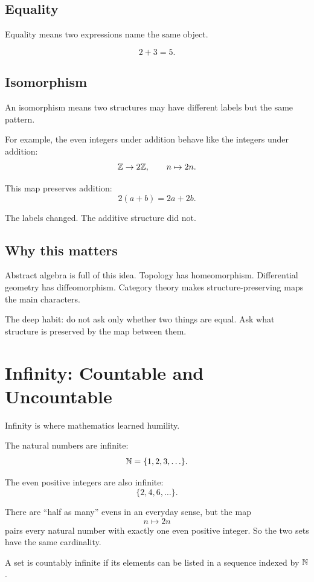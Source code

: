 \documentclass[11pt]{article}
\begin{document}
\subsection{Equality}

Equality means two expressions name the same object.

\[
2+3=5.
\]

\subsection{Isomorphism}

An isomorphism means two structures may have different labels but the same pattern.

For example, the even integers under addition behave like the integers under addition:
\[
\mathbb{Z} \to 2\mathbb{Z},\qquad n\mapsto 2n.
\]

This map preserves addition:
\[
2(a+b)=2a+2b.
\]

The labels changed. The additive structure did not.

\subsection{Why this matters}

Abstract algebra is full of this idea. Topology has homeomorphism. Differential geometry has diffeomorphism. Category theory makes structure-preserving maps the main characters.

The deep habit: do not ask only whether two things are equal. Ask what structure is preserved by the map between them.

\newpage
\section{Infinity: Countable and Uncountable}

Infinity is where mathematics learned humility.

The natural numbers are infinite:
\[
\mathbb{N}=\{1,2,3,\ldots\}.
\]

The even positive integers are also infinite:
\[
\{2,4,6,\ldots\}.
\]

There are ``half as many'' evens in an everyday sense, but the map
\[
n\mapsto 2n
\]
pairs every natural number with exactly one even positive integer. So the two sets have the same cardinality.

\begin{definition}
A set is countably infinite if its elements can be listed in a sequence indexed by $\mathbb{N}$.
\end{definition}
\end{document}
